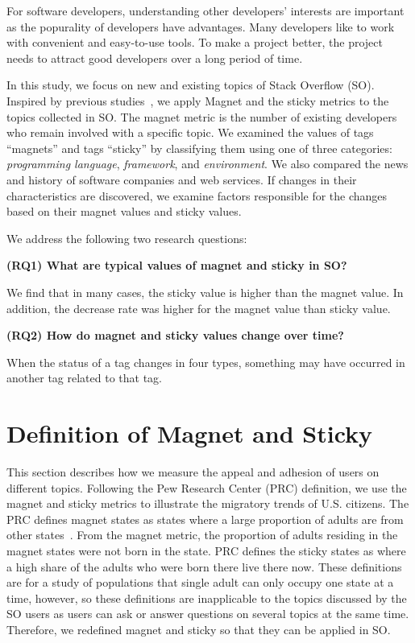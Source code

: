 \documentclass[conference]{IEEEtran}
\begin{document}
For software developers, understanding other developers' interests are important as the popurality of developers have advantages. Many developers like to work with convenient and easy-to-use tools. To make a project better, the project needs to attract good developers over a long period of time. 

In this study, we focus on new and existing topics of Stack Overflow (SO). Inspired by previous studies~\cite{yamashita2016magnet}, we apply Magnet and the sticky metrics to the topics collected in SO. 
The magnet metric is the number of existing developers who remain involved with a specific topic.
We examined the values of tags ``magnets'' and tags ``sticky'' by classifying them using one of three categories: \emph{programming language}, \emph{framework}, and \emph{environment}. We also compared the news and history of software  companies and web services. If changes in their characteristics are discovered, we examine factors responsible for the changes based on their magnet values and sticky values. 

We address the following two research questions:

\noindent \textbf{(RQ1) What are typical values of magnet and sticky in SO?}\par
We find that in many cases, the sticky value is higher than the magnet value. In addition, the decrease rate was higher for the magnet value than sticky value.

\noindent \textbf{(RQ2) How do magnet and sticky values change over time?}\par
When the status of a tag changes in four types, something may have occurred in another tag related to that tag.

\section{Definition of Magnet and Sticky} \label{magnet}
This section describes how we measure the appeal and adhesion of users on different topics. Following the Pew Research Center (PRC) definition, we use the magnet and sticky metrics to illustrate the migratory trends of U.S. citizens. The PRC defines magnet states as states where a large proportion of adults are from other states~\cite{communityeconomic}. From the magnet metric, the proportion of adults residing in the magnet states were not born in the state. PRC defines the sticky states as where a high share of the adults who were born there live there now. These definitions are for a study of populations that single adult can only occupy one state at a time, however, so these definitions are inapplicable to the topics discussed by the SO users as users can ask or answer questions on several topics at the same time. Therefore, we redefined magnet and sticky so that they can be applied in SO.
\end{document}

